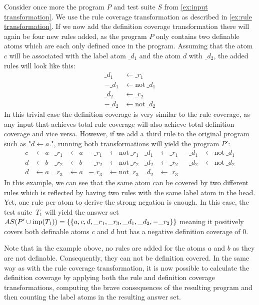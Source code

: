 \begin{example}
\label{ex:definition transformation}
    Consider once more the program $P$ and test suite $S$ from \cref{ex:input transformation}. We use the rule coverage transformation as described in \cref{ex:rule transformation}. If we now add the definition coverage transformation there will again be four new rules added, as the program $P$ only contains two definable atoms which are each only defined once in the program. Assuming that the atom $c$ will be associated with the label atom $\_d_1$ and the atom $d$ with $\_d_2$, the added rules will look like this:
    \begin{align*}
        \_d_1 &\leftarrow \_r_1 \\
        -\_d_1 &\leftarrow \text{not}\ \_d_1 \\
        \_d_2 &\leftarrow \_r_2 \\
        -\_d_2 &\leftarrow \text{not}\ \_d_2
    \end{align*}
    In this trivial case the definition coverage is very similar to the rule coverage, as any input that achieves total rule coverage will also achieve total definition coverage and vice versa. However, if we add a third rule to the original program such as "\(d \leftarrow a.\)", running both transformations will yield the program $P'$:
    \begin{align*}
        c &\leftarrow a      &  \_r_1 &\leftarrow a   & -\_r_1 &\leftarrow \text{not}\ \_r_1   &  \_d_1 &\leftarrow \_r_1     &   -\_d_1 &\leftarrow \text{not}\ \_d_1 \\
        d &\leftarrow b      &  \_r_2 &\leftarrow b   & -\_r_2 &\leftarrow \text{not}\ \_r_2   &  \_d_2 &\leftarrow \_r_2     &   -\_d_2 &\leftarrow \text{not}\ \_d_2 \\
        d &\leftarrow a      &  \_r_3 &\leftarrow a   & -\_r_3 &\leftarrow \text{not}\ \_r_3   &  \_d_2 &\leftarrow \_r_3 
    \end{align*}
    In this example, we can see that the same atom can be covered by two different rules which is reflected by having two rules with the same label atom in the head. Yet, one rule per atom to derive the strong negation is enough. In this case, the test suite~$T_1$ will yield the answer set \(AS(P' \cup \operatorname{inp}(T_1)) = \{\{a, c, d, \_r_1, \_r_3, \_d_1, \_d_2, -\_r_2\}\}\) meaning it positively covers both definable atoms $c$ and $d$ but has a negative definition coverage of 0.
\end{example}

Note that in the example above, no rules are added for the atoms $a$ and $b$ as they are not definable. Consequently, they can not be definition covered. In the same way as with the rule coverage transformation, it is now possible to calculate the definition coverage by applying both the rule and definition coverage transformations, computing the brave consequences of the resulting program and then counting the label atoms in the resulting answer set.

